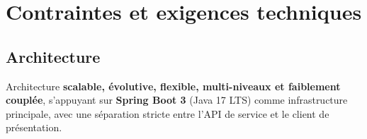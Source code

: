 \chapter{Contraintes et exigences techniques}

\section{Architecture}
Architecture \textbf{scalable, évolutive, flexible, multi-niveaux et faiblement
couplée}, s'appuyant sur \textbf{Spring Boot 3} (Java 17 LTS) comme
infrastructure principale, avec une séparation stricte entre l'API de service et
le client de présentation.


